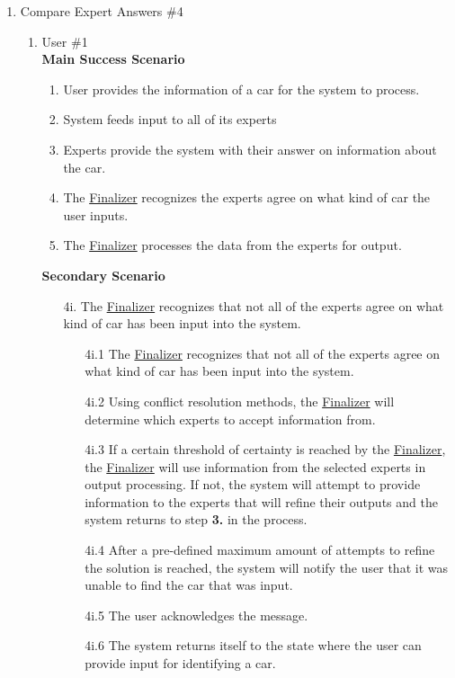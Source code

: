 \documentclass[]{article}
\begin{document}
\begin{enumerate}[label={\bf BE\arabic*.}]
	\item Compare Expert Answers \#4
	\begin{enumerate}[label={\bf VP\arabic*.}]
		\item User \#1\\
		\textbf{Main Success Scenario}
		\begin{enumerate}[label={\arabic*.}]
			\color{red}
			\item User provides the information of a car for the system to process.
			\item System feeds input to all of its experts
			\item Experts provide the system with their answer on information about the car.
			\item The \underline{Finalizer} recognizes the experts agree on what kind of car the user inputs.
			\item The \underline{Finalizer} processes the data from the experts for output.
		\end{enumerate}
		\textbf{Secondary Scenario}
		\begin{enumerate}
			\color{red}
			\item[4i.] The \underline{Finalizer} recognizes that not all of the experts agree on what kind of car has been input into the system.
			\begin{enumerate}
				\item[4i.1] The \underline{Finalizer} recognizes that not all of the experts agree on what kind of car has been input into the system.
				\item[4i.2] Using conflict resolution methods, the \underline{Finalizer} will determine which experts to accept information from.
				\item[4i.3] If a certain threshold of certainty is reached by the \underline{Finalizer}, the \underline{Finalizer} will use information from the selected experts in output processing. If not, the system will attempt to provide information to the experts that will refine their outputs and the system returns to step  \textbf{3.} in the process.
				\item[4i.4] After a pre-defined maximum amount of attempts to refine the solution is reached, the system will notify the user that it was unable to find the car that was input.
				\item[4i.5] The user acknowledges the message.
				\item[4i.6] The system returns itself to the state where the user can provide input for identifying a car.
			\end{enumerate}

\end{enumerate}
\end{enumerate}
\end{enumerate}
\end{document}
